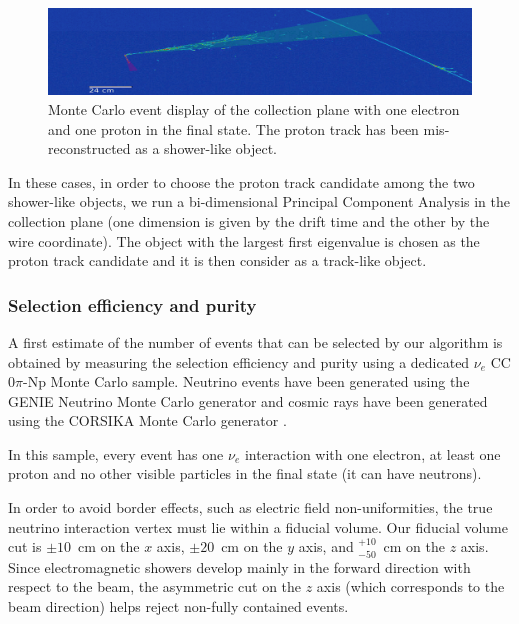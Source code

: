 \begin{figure}[htbp]
	\begin{center}
    	\includegraphics[width=0.8\linewidth]{figures/2showers.png}
    	\caption{Monte Carlo event display of the collection plane with one electron and one proton in the final state. The proton track has been mis-reconstructed as a shower-like object.} \label{fig:2showers}
	\end{center}
\end{figure}

In these cases, in order to choose the proton track candidate among the two shower-like objects, we run a bi-dimensional Principal Component Analysis in the collection plane (one dimension is given by the drift time and the other by the wire coordinate). The object with the largest first eigenvalue is chosen as the proton track candidate and it is then consider as a track-like object.

\subsubsection{Selection efficiency and purity}
A first estimate of the number of events that can be selected by our algorithm is obtained by measuring the selection efficiency and purity using a dedicated $\nu_{e}$ CC$0\pi$-Np Monte Carlo sample. Neutrino events have been generated using the GENIE Neutrino Monte Carlo generator \cite{genie} and cosmic rays have been generated using the CORSIKA Monte Carlo generator \cite{corsika}. 

In this sample, every event has one $\nu_{e}$ interaction with one electron, at least one proton and no other visible particles in the final state (it can have neutrons). 

In order to avoid border effects, such as electric field non-uniformities, the true neutrino interaction vertex must lie within a fiducial volume. Our fiducial volume cut is $\pm10$~cm on the $x$ axis, $\pm20$~cm on the $y$ axis, and $^{+10}_{-50}$~cm on the $z$ axis. 
Since electromagnetic showers develop mainly in the forward direction with respect to the beam, the asymmetric cut on the $z$ axis (which corresponds to the beam direction) helps reject non-fully contained events.

